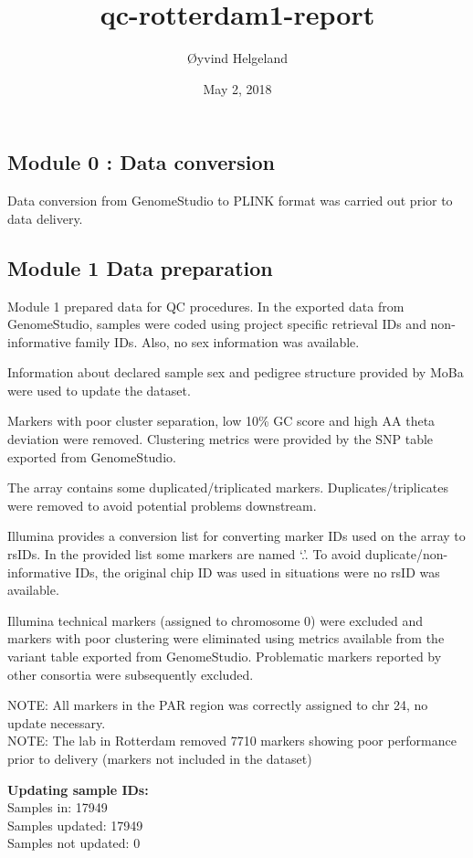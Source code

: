 \documentclass[]{article}
\title{qc-rotterdam1-report}
\author{Øyvind Helgeland}
\date{May 2, 2018}
\begin{document}
\maketitle

\subsection{Module 0 : Data conversion}\label{module-0-data-conversion}

Data conversion from GenomeStudio to PLINK format was carried out prior
to data delivery.

\subsection{Module 1 Data preparation}\label{module-1-data-preparation}

Module 1 prepared data for QC procedures. In the exported data from
GenomeStudio, samples were coded using project specific retrieval IDs
and non-informative family IDs. Also, no sex information was available.

Information about declared sample sex and pedigree structure provided by
MoBa were used to update the dataset.

Markers with poor cluster separation, low 10\% GC score and high AA
theta deviation were removed. Clustering metrics were provided by the
SNP table exported from GenomeStudio.

The array contains some duplicated/triplicated markers.
Duplicates/triplicates were removed to avoid potential problems
downstream.

Illumina provides a conversion list for converting marker IDs used on
the array to rsIDs. In the provided list some markers are named `.'. To
avoid duplicate/non-informative IDs, the original chip ID was used in
situations were no rsID was available.

Illumina technical markers (assigned to chromosome 0) were excluded and
markers with poor clustering were eliminated using metrics available
from the variant table exported from GenomeStudio. Problematic markers
reported by other consortia were subsequently excluded.

NOTE: All markers in the PAR region was correctly assigned to chr 24, no
update necessary.\\
NOTE: The lab in Rotterdam removed 7710 markers showing poor performance
prior to delivery (markers not included in the dataset)

\textbf{Updating sample IDs:}\\
Samples in: 17949\\
Samples updated: 17949\\
Samples not updated: 0
\end{document}
